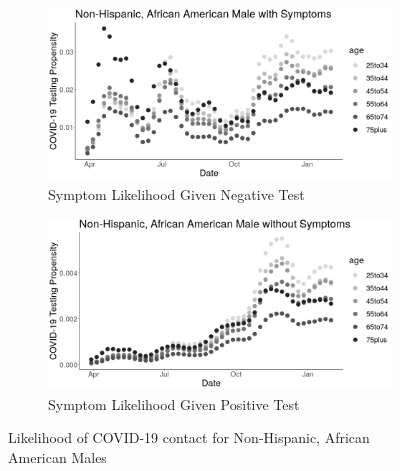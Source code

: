 \documentclass[11pt]{amsart}
\numberwithin{equation}{section}
\theoremstyle{plain}
\begin{document}
\begin{figure}[!th]
\centering
\begin{subfigure}{.5\textwidth}
 \centering
 \includegraphics[width=.9\linewidth]{../figs/tvprop_alt_fig1_supp1.png}
 \caption{Symptom Likelihood Given Negative Test}
\end{subfigure}%
\begin{subfigure}{.5\textwidth}
 \centering
\includegraphics[width=.9\linewidth]{../figs/tvprop_alt_fig2_supp1.png}
 \caption{Symptom Likelihood Given Positive Test}
\end{subfigure}
\caption{Likelihood of COVID-19 contact for Non-Hispanic, African American Males}
\label{fig:nonh-aa-male}
\end{figure}
\end{document}
